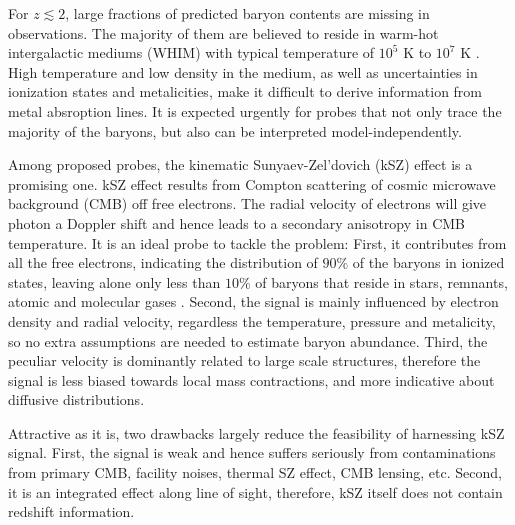 For $z\lesssim 2$, large fractions of predicted baryon contents are missing in observations.  
The majority of them are believed to reside in warm-hot intergalactic mediums (WHIM) with typical temperature of $10^5$ K to $10^7$ K \cite{Pen1999,Soltan06}. 
High temperature and low density in the medium, 
as well as uncertainties in ionization states and metalicities, 
make it difficult to derive information from metal absroption lines. 
It is expected urgently for probes that not only trace the majority of the baryons, but also can be interpreted model-independently.

Among proposed probes, the kinematic Sunyaev-Zel'dovich (kSZ) effect \cite{Sunyaev72,Sunyaev80,Vishniac87} is a promising one.  
kSZ effect results from Compton scattering of cosmic microwave background (CMB) off free electrons. 
The radial velocity of electrons will give photon a Doppler shift 
and hence leads to a 
secondary anisotropy in CMB temperature.
It is an ideal probe to tackle the problem: 
First, it contributes from all the free electrons, indicating the distribution of $90\%$ of the baryons in ionized states,   
leaving alone only less than $10\%$ of baryons that 
reside in stars, remnants, atomic and molecular gases \cite{Fukugita04}. 
%
Second, the signal is mainly influenced by electron density and radial velocity, 
regardless the temperature, pressure and metalicity,  
so no extra assumptions are needed to estimate baryon abundance.  
%
Third, the peculiar velocity is dominantly related to large scale structures, 
therefore the signal is less biased towards local mass contractions, 
and more indicative about diffusive distributions.  

Attractive as it is, two drawbacks largely reduce the feasibility of harnessing kSZ signal.  
First, the signal is weak 
and hence suffers seriously from contaminations 
from primary CMB, facility noises, 
thermal SZ effect, CMB lensing, etc.  
Second, it is an integrated effect along line of sight, therefore, kSZ itself does not contain redshift information.

